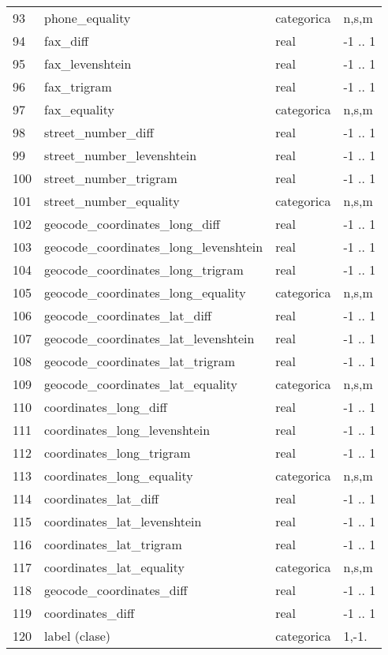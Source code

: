 \documentclass[journal]{IEEEtran}
\begin{document}
\begin{table}[ht!]
\begin{tabular}{l | l l l}
93	& phone\_equality  &    categorica &  n,s,m  \\
94	& fax\_diff  &   real & -1 .. 1  \\
95	& fax\_levenshtein  &   real & -1 .. 1  \\
96	& fax\_trigram  &   real & -1 .. 1  \\
97	& fax\_equality  &    categorica &  n,s,m  \\
98	& street\_number\_diff  &   real & -1 .. 1  \\
99	& street\_number\_levenshtein  &   real & -1 .. 1  \\
100	& street\_number\_trigram  &   real & -1 .. 1  \\
101	& street\_number\_equality  &    categorica &  n,s,m  \\
102	& geocode\_coordinates\_long\_diff  &   real & -1 .. 1  \\
103	& geocode\_coordinates\_long\_levenshtein  &   real & -1 .. 1  \\
104	& geocode\_coordinates\_long\_trigram  &   real & -1 .. 1  \\
105	& geocode\_coordinates\_long\_equality  &    categorica &  n,s,m  \\
106	& geocode\_coordinates\_lat\_diff  &   real & -1 .. 1  \\
107	& geocode\_coordinates\_lat\_levenshtein  &   real & -1 .. 1  \\
108	& geocode\_coordinates\_lat\_trigram  &   real & -1 .. 1  \\
109	& geocode\_coordinates\_lat\_equality  &    categorica &  n,s,m  \\
110	& coordinates\_long\_diff  &   real & -1 .. 1  \\
111	& coordinates\_long\_levenshtein  &   real & -1 .. 1  \\
112	& coordinates\_long\_trigram  &   real & -1 .. 1  \\
113	& coordinates\_long\_equality  &    categorica &  n,s,m  \\
114	& coordinates\_lat\_diff  &   real & -1 .. 1  \\
115	& coordinates\_lat\_levenshtein  &   real & -1 .. 1  \\
116	& coordinates\_lat\_trigram  &   real & -1 .. 1  \\
117	& coordinates\_lat\_equality  &    categorica &  n,s,m  \\
118	& geocode\_coordinates\_diff  &   real & -1 .. 1  \\
119	& coordinates\_diff  &   real & -1 .. 1  \\
120	& label (clase) & categorica &  1,-1. \\
\end{tabular}
\end{table}
\end{document}
